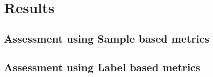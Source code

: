\chapter{Results}

\section {Assessment using Sample based metrics}
\section {Assessment using Label based metrics}

